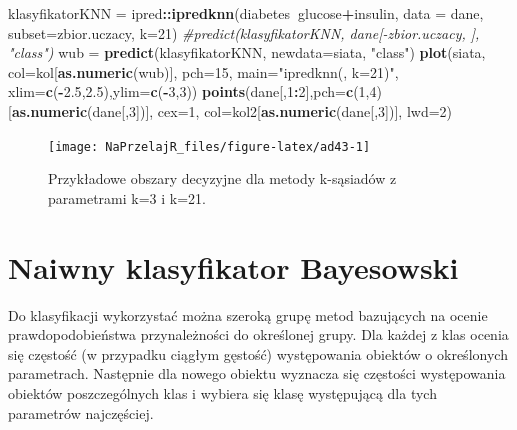 \documentclass[polish,]{book}
\newenvironment{Shaded}{\begin{snugshade}}{\end{snugshade}}
\newcommand{\CommentTok}[1]{\textcolor[rgb]{0.56,0.35,0.01}{\textit{#1}}}
\newcommand{\DataTypeTok}[1]{\textcolor[rgb]{0.13,0.29,0.53}{#1}}
\newcommand{\DecValTok}[1]{\textcolor[rgb]{0.00,0.00,0.81}{#1}}
\newcommand{\FloatTok}[1]{\textcolor[rgb]{0.00,0.00,0.81}{#1}}
\newcommand{\KeywordTok}[1]{\textcolor[rgb]{0.13,0.29,0.53}{\textbf{#1}}}
\newcommand{\NormalTok}[1]{#1}
\newcommand{\OperatorTok}[1]{\textcolor[rgb]{0.81,0.36,0.00}{\textbf{#1}}}
\newcommand{\StringTok}[1]{\textcolor[rgb]{0.31,0.60,0.02}{#1}}
\begin{document}
\begin{Shaded}
\begin{Highlighting}[]
\NormalTok{klasyfikatorKNN =}\StringTok{ }\NormalTok{ipred}\OperatorTok{::}\KeywordTok{ipredknn}\NormalTok{(diabetes}\OperatorTok{~}\NormalTok{glucose}\OperatorTok{+}\NormalTok{insulin, }
                                  \DataTypeTok{data =}\NormalTok{ dane, }\DataTypeTok{subset=}\NormalTok{zbior.uczacy, }\DataTypeTok{k=}\DecValTok{21}\NormalTok{)}
\CommentTok{#predict(klasyfikatorKNN, dane[-zbior.uczacy, ], "class")}
\NormalTok{wub =}\StringTok{ }\KeywordTok{predict}\NormalTok{(klasyfikatorKNN, }\DataTypeTok{newdata=}\NormalTok{siata, }\StringTok{"class"}\NormalTok{)}
\KeywordTok{plot}\NormalTok{(siata, }\DataTypeTok{col=}\NormalTok{kol[}\KeywordTok{as.numeric}\NormalTok{(wub)], }\DataTypeTok{pch=}\DecValTok{15}\NormalTok{, }\DataTypeTok{main=}\StringTok{"ipredknn(, k=21)"}\NormalTok{,}
     \DataTypeTok{xlim=}\KeywordTok{c}\NormalTok{(}\OperatorTok{-}\FloatTok{2.5}\NormalTok{,}\FloatTok{2.5}\NormalTok{),}\DataTypeTok{ylim=}\KeywordTok{c}\NormalTok{(}\OperatorTok{-}\DecValTok{3}\NormalTok{,}\DecValTok{3}\NormalTok{))}
\KeywordTok{points}\NormalTok{(dane[,}\DecValTok{1}\OperatorTok{:}\DecValTok{2}\NormalTok{],}\DataTypeTok{pch=}\KeywordTok{c}\NormalTok{(}\DecValTok{1}\NormalTok{,}\DecValTok{4}\NormalTok{)[}\KeywordTok{as.numeric}\NormalTok{(dane[,}\DecValTok{3}\NormalTok{])], }\DataTypeTok{cex=}\DecValTok{1}\NormalTok{, }
       \DataTypeTok{col=}\NormalTok{kol2[}\KeywordTok{as.numeric}\NormalTok{(dane[,}\DecValTok{3}\NormalTok{])], }\DataTypeTok{lwd=}\DecValTok{2}\NormalTok{)}
\end{Highlighting}
\end{Shaded}

\begin{figure}[h]

{\centering \texttt{[image: NaPrzelajR\_files/figure-latex/ad43-1]} 

}

\caption{Przykładowe obszary decyzyjne dla metody k-sąsiadów z parametrami k=3 i k=21.}\label{fig:ad43}
\end{figure}

\hypertarget{part_43}{%
\section{Naiwny klasyfikator Bayesowski}\label{part_43}}

Do klasyfikacji wykorzystać można szeroką grupę metod bazujących na ocenie prawdopodobieństwa przynależności do określonej grupy. Dla każdej z klas ocenia się częstość (w przypadku ciągłym gęstość) występowania obiektów o określonych parametrach. Następnie dla nowego obiektu wyznacza się częstości występowania obiektów
poszczególnych klas i wybiera się klasę występującą dla tych parametrów najczęściej.
\end{document}
